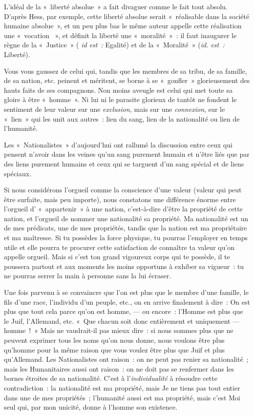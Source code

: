 \documentclass[french,twoside]{book} %
\begin{document}
L’idéal de la « liberté absolue » a fait divaguer comme le fait tout absolu. D’après Hess, par exemple, cette liberté absolue serait « réalisable dans la société humaine absolue », et un peu plus bas le même auteur appelle cette réalisation une « vocation  », et définit la liberté une « moralité » : il faut inaugurer le règne de la « Justice » (\emph{ id est :} Egalité) et de la « Moralité » (\emph{id. est :} Liberté).\par
Vous vous gaussez de celui qui, tandis que les membres de sa tribu, de sa famille, de sa nation, etc. peinent et méritent, se borne à se « gonfler » glorieusement des hauts faits de ses compagnons. Non moins aveugle est celui qui met toute sa gloire à être « homme ». Ni lui ni le parasite glorieux de tantôt ne fondent le sentiment de leur valeur sur une \emph{exclusion,} mais sur une \emph{connexion}, sur le « lien » qui les unit aux autres : lien du sang, lien de la nationalité ou lien de l’humanité.\par
Les « Nationalistes » d’aujourd’hui ont rallumé la discussion entre ceux qui pensent n’avoir dans les veines qu’un sang purement humain et n’être liés que par des liens purement humains et ceux qui se targuent d’un sang spécial et de liens spéciaux.\par
Si nous considérons l’orgueil comme la conscience d’une valeur (valeur qui peut être surfaite, mais peu importe), nous constatons une différence énorme entre l’orgueil d’ « appartenir » à une nation, c’est-à-dire d’être la propriété de cette nation, et l’orgueil de nommer une nationalité sa propriété. Ma nationalité est un de mes prédicats, une de mes propriétés, tandis que la nation est ma propriétaire et ma maîtresse. Si tu possèdes la force physique, tu pourras l’employer en temps utile et elle pourra te procurer cette satisfaction de connaître ta valeur qu’on appelle orgueil. Mais si c’est ton grand vigoureux corps qui te possède, il te poussera partout et aux moments les moins opportuns à exhiber sa vigueur : tu ne pourras serrer la main à personne sans la lui écraser.\par
Une fois parvenu à se convaincre que l’on est plus que le membre d’une famille, le fils d’une race, l’individu d’un peuple, etc., on en arrive finalement à dire : On est plus que tout cela parce qu’on est homme, — ou encore : l’Homme est plus que le  Juif, l’Allemand, etc. « Que chacun soit donc entièrement et uniquement — homme ! » Mais ne vaudrait-il pas mieux dire : si nous sommes plus que ne peuvent exprimer tous les noms qu’on nous donne, nous voulons être plus qu’homme pour la même raison que vous voulez être plus que Juif et plus qu’Allemand. Les Nationalistes ont raison : on ne peut pas renier sa nationalité ; mais les Humanitaires aussi ont raison : on ne doit pas se renfermer dans les bornes étroites de sa nationalité. C’est à l’\emph{individualité} à résoudre cette contradiction : la nationalité est ma propriété, mais Je ne tiens pas tout entier dans une de mes propriétés ; l’humanité aussi est ma propriété, mais c’est Moi seul qui, par mon unicité, donne à l’homme son existence.\par
\end{document}
